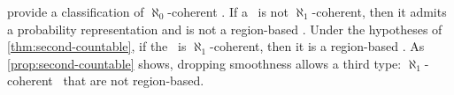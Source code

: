  provide a classification of $\aleph_0$-coherent \summs. If a \summ \ is not $\aleph_1$-coherent, then it admits a probability representation and is not a region-based \summ. Under the hypotheses of \cref{thm:second-countable}, if the \summ \ is $\aleph_1$-coherent, then it is a region-based \summ. As \cref{prop:second-countable} shows, dropping smoothness allows a third type: $\aleph_1$-coherent \summs \ that are not region-based.


